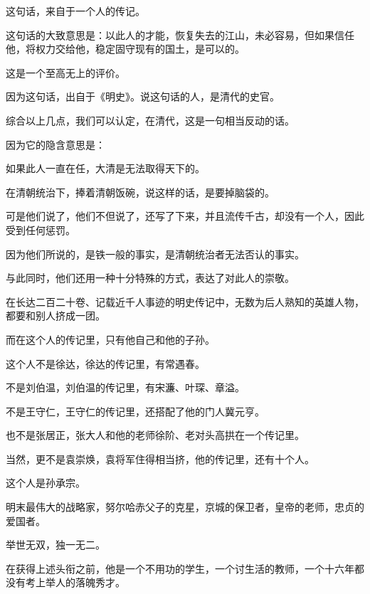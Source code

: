 \begin{multicols}{\theparacolNo}
		这句话，来自于一个人的传记。

		这句话的大致意思是：以此人的才能，恢复失去的江山，未必容易，但如果信任他，将权力交给他，稳定固守现有的国土，是可以的。

		这是一个至高无上的评价。

		因为这句话，出自于《明史》。说这句话的人，是清代的史官。

		综合以上几点，我们可以认定，在清代，这是一句相当反动的话。

		因为它的隐含意思是：

		如果此人一直在任，大清是无法取得天下的。

		在清朝统治下，捧着清朝饭碗，说这样的话，是要掉脑袋的。

		可是他们说了，他们不但说了，还写了下来，并且流传千古，却没有一个人，因此受到任何惩罚。

		因为他们所说的，是铁一般的事实，是清朝统治者无法否认的事实。

		与此同时，他们还用一种十分特殊的方式，表达了对此人的崇敬。

		在长达二百二十卷、记载近千人事迹的明史传记中，无数为后人熟知的英雄人物，都要和别人挤成一团。

		而在这个人的传记里，只有他自己和他的子孙。

		这个人不是徐达，徐达的传记里，有常遇春。

		不是刘伯温，刘伯温的传记里，有宋濂、叶琛、章溢。

		不是王守仁，王守仁的传记里，还搭配了他的门人冀元亨。

		也不是张居正，张大人和他的老师徐阶、老对头高拱在一个传记里。

		当然，更不是袁崇焕，袁将军住得相当挤，他的传记里，还有十个人。

		这个人是孙承宗。

		明末最伟大的战略家，努尔哈赤父子的克星，京城的保卫者，皇帝的老师，忠贞的爱国者。

		举世无双，独一无二。

		在获得上述头衔之前，他是一个不用功的学生，一个讨生活的教师，一个十六年都没有考上举人的落魄秀才。

		\ifnum{}
	\end{multicols}
\fi
\newpage

